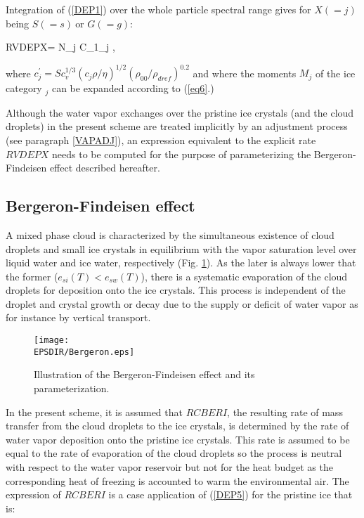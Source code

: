 Integration of (\ref{DEP1}) over the whole particle spectral range gives for
$X(=j)$ being $S(=s)\ $or $G(=g)$:

\be\label{DEP5}
RVDEPX=\frac{\displaystyle{4\pi}}{\displaystyle{\rho}}
    N_j {{\cal C}_1}_j
    ,
\ee

\noindent where
$c^\prime_j=Sc_{v}^{1/3}(c_j \rho/\eta)^{1/2}(\rho_{00}/\rho_{dref})^{0.2}$ and
where the moments $M_j$ of the ice category $_j$ can be expanded according to
(\ref{eq6}.)

Although the water vapor exchanges over the pristine ice crystals (and the
cloud droplets) in the present scheme are treated implicitly by an adjustment
process (see paragraph \ref{VAPADJ}), an expression equivalent to the explicit
rate $RVDEPX$ needs to be computed for the purpose of parameterizing the
Bergeron-Findeisen effect described hereafter.

%
\subsection{Bergeron-Findeisen effect}
%
A mixed phase cloud is characterized by the simultaneous existence of cloud
droplets and small ice crystals in equilibrium with the vapor saturation level
over liquid water and ice water, respectively (Fig. \ref{mixfigBergeron}).
As the later is always lower
that the former ($e_{si}(T) < e_{sw}(T)$), there is a systematic evaporation of
the cloud droplets for deposition onto the ice crystals. This process is
independent of the droplet and crystal growth or decay due to the supply or
deficit of water vapor as for instance by vertical transport.

\begin{figure}[!ht]
\centerline{\texttt{[image: \\EPSDIR/Bergeron.eps]}}
\caption{Illustration of the Bergeron-Findeisen effect and its parameterization.}
\label{mixfigBergeron}
\end{figure}

In the present scheme, it is assumed that $RCBERI$, the resulting rate of mass
transfer from the cloud droplets to the ice crystals, is determined by the rate
of water vapor deposition onto the pristine ice crystals. This rate is assumed
to be equal to the rate of evaporation of the cloud droplets so the process is
neutral with respect to the water vapor reservoir but not for the heat budget
as the corresponding heat of freezing is accounted to warm the environmental
air. The expression of $RCBERI$ is a case application of (\ref{DEP5}) for the
pristine ice that is:


